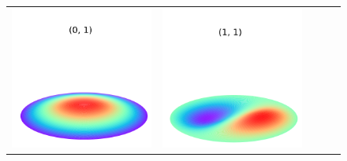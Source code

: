 \documentclass[a4paper]{ctexart}
\begin{document}
	\begin{figure}[htbp]
		\begin{tabular}{ccccc}
			\includegraphics[scale=0.4]{0_1.png} & \includegraphics[scale=0.4]{1_1.png}

\end{tabular}
\end{figure}
\end{document}
